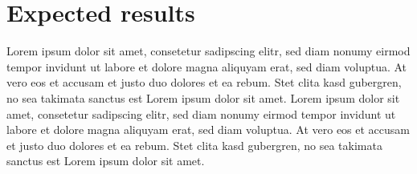 \documentclass[10pt]{article}
\begin{document}
\section{Expected results}

Lorem ipsum dolor sit amet, consetetur sadipscing elitr, sed diam nonumy eirmod tempor invidunt ut labore et dolore magna aliquyam erat, sed diam voluptua. At vero eos et accusam et justo duo dolores et ea rebum. Stet clita kasd gubergren, no sea takimata sanctus est Lorem ipsum dolor sit amet. Lorem ipsum dolor sit amet, consetetur sadipscing elitr, sed diam nonumy eirmod tempor invidunt ut labore et dolore magna aliquyam erat, sed diam voluptua. At vero eos et accusam et justo duo dolores et ea rebum. Stet clita kasd gubergren, no sea takimata sanctus est Lorem ipsum dolor sit amet.


\end{document}
